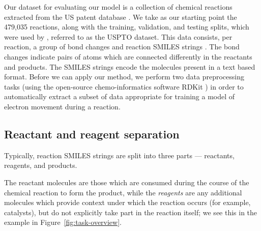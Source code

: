 

Our dataset for evaluating our model is a collection of chemical reactions extracted from the US patent database \citep{Lowe2017}.
We take as our starting point the 479,035 reactions, along with the training, validation, and testing splits, 
which were used by \citet{jin2017predicting}, referred to as the USPTO dataset.
This data consists, per reaction, a group of bond changes and reaction SMILES strings \citep{weininger1988smiles}.
The bond changes indicate pairs of atoms which are connected differently in the reactants and products.
The SMILES strings encode the molecules present in a text based format.
Before we can apply our method, we perform two data preprocessing tasks 
(using the open-source chemo-informatics software RDKit \citep{rdkit}) 
in order to automatically
extract a subset of data appropriate for training a model of electron movement during a reaction. 

\subsection{Reactant and reagent separation}

Typically, reaction SMILES strings are split into three parts --- reactants, reagents, and products.

The reactant molecules are those which are consumed during the course of the chemical reaction to form the  product, 
while the {\em reagents} are any additional molecules which provide context under which the reaction occurs (for example, catalysts),
but do not explicitly take part in the reaction itself; we see this in the example in Figure~\ref{fig:task-overview}.

